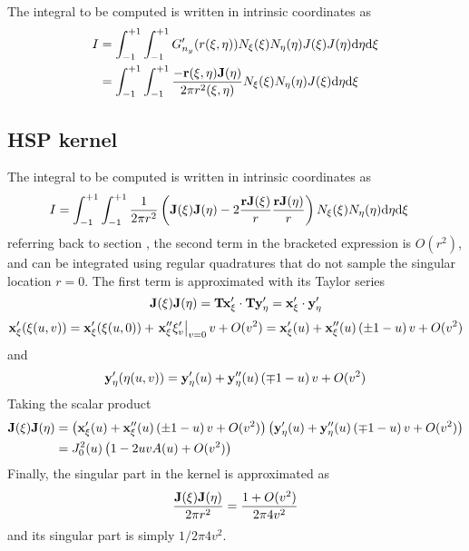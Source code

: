 The integral to be computed is written in intrinsic coordinates as
%
\begin{align}
	I 
	&= \int_{-1}^{+1}
	\int_{-1}^{+1}
	G'_{n_y}(r(\xi,\eta)) 
	N_{\xi}(\xi) N_{\eta}(\eta)
	J(\xi) J(\eta)
	\mathrm{d} \eta
	\mathrm{d} \xi \\
	&= \int_{-1}^{+1}
	\int_{-1}^{+1}
	\frac{-{\bf r}(\xi,\eta) {\bf J}(\eta)}{2\pi r^2(\xi,\eta)}
	N_{\xi}(\xi) N_{\eta}(\eta)
	J(\xi)
	\mathrm{d} \eta
	\mathrm{d} \xi
\end{align}

\subsection{HSP kernel}

The integral to be computed is written in intrinsic coordinates as
%
\begin{align}
	I 
	&= \int_{-1}^{+1}
	\int_{-1}^{+1}
	\frac{1}{2\pi r^2} \left(
	{\bf J}(\xi) {\bf J}(\eta) - 2 \frac{{\bf r} {\bf J}(\xi)}{r} \frac{{\bf r}{\bf J}(\eta)}{r} 
	\right)	N_{\xi}(\xi)
	N_{\eta}(\eta)
	\mathrm{d} \eta
	\mathrm{d} \xi
\end{align}
%
referring back to section \label{sec:}, the second term in the bracketed expression is $O(r^2)$, and can be integrated using regular quadratures that do not sample the singular location $r=0$.
The first term is approximated with its Taylor series
%
\begin{equation}
	{\bf J}(\xi) {\bf J}(\eta) 
	= {\bf T} {\bf x}'_{\xi} \cdot {\bf T} {\bf y}'_{\eta}
	= {\bf x}'_{\xi} \cdot {\bf y}'_{\eta}
\end{equation}
%
\begin{equation}
	{\bf x}'_{\xi}(\xi(u,v)) 
	= {\bf x}'_{\xi}(\xi(u,0)) + \left.{\bf x}''_{\xi} \xi'_v \right|_{v=0} v + O(v^2) 
	= {\bf x}'_{\xi}(u) + {\bf x}''_{\xi}(u) \left(\pm 1 - u\right) v + O(v^2) 
\end{equation}
%
and
%
\begin{equation}
	{\bf y}'_{\eta}(\eta(u,v)) 
	= {\bf y}'_{\eta}(u) + {\bf y}''_{\eta}(u) \left(\mp 1 - u\right) v + O(v^2) 
\end{equation}
%
Taking the scalar product
%
\begin{align}
	{\bf J}(\xi) {\bf J}(\eta) 
	&= \left(
	{\bf x}'_{\xi}(u) + {\bf x}''_{\xi}(u) \left(\pm 1 - u\right) v + O(v^2) 
	\right)
	\left(
	{\bf y}'_{\eta}(u) + {\bf y}''_{\eta}(u) \left(\mp 1 - u\right) v + O(v^2) 	
	\right) \\
	&= J_0^2(u) \left(1 -2uvA(u) + O(v^2) \right)
\end{align}
%
Finally, the singular part in the kernel is approximated as
%
\begin{equation}
	\frac{{\bf J}(\xi) {\bf J}(\eta)}{2\pi r^2}
	= \frac{1 + O(v^2)}{2\pi 4v^2}
\end{equation}
%
and its singular part is simply $1/2\pi 4 v^2$.

